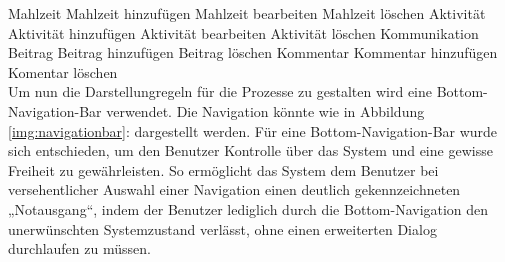 \noindent\hspace*{10mm}Mahlzeit\newline
\noindent\hspace*{20mm}Mahlzeit hinzufügen\newline
\noindent\hspace*{20mm}Mahlzeit bearbeiten\newline 
\noindent\hspace*{20mm}Mahlzeit löschen\newline
\noindent\hspace*{10mm}Aktivität\newline
\noindent\hspace*{20mm}Aktivität hinzufügen\newline
\noindent\hspace*{20mm}Aktivität bearbeiten\newline
\noindent\hspace*{20mm}Aktivität löschen\newline
Kommunikation\newline
\noindent\hspace*{10mm}Beitrag\newline
\noindent\hspace*{20mm}Beitrag hinzufügen\newline
\noindent\hspace*{20mm}Beitrag löschen\newline
\noindent\hspace*{10mm}Kommentar\newline
\noindent\hspace*{20mm}Kommentar hinzufügen\newline
\noindent\hspace*{20mm}Komentar löschen\\
Um nun die Darstellungregeln für die Prozesse zu gestalten wird eine Bottom-Navigation-Bar verwendet. Die Navigation könnte wie in Abbildung \ref{img:navigationbar}:  dargestellt werden. \newline
Für eine Bottom-Navigation-Bar wurde sich entschieden, um den Benutzer Kontrolle über das System und eine gewisse Freiheit zu gewährleisten. So ermöglicht das System dem Benutzer bei versehentlicher Auswahl einer Navigation einen deutlich gekennzeichneten „Notausgang“, indem der Benutzer lediglich durch die Bottom-Navigation den unerwünschten Systemzustand verlässt, ohne einen erweiterten Dialog durchlaufen zu müssen.
